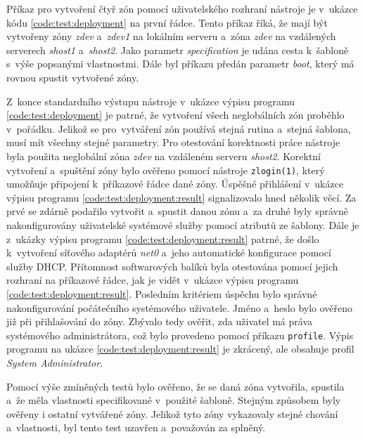 Příkaz pro vytvoření čtyř zón pomocí uživatelského rozhraní nástroje je v~ukázce kódu \ref{code:test:deployment} na první řádce.
Tento příkaz říká, že mají být vytvořeny zóny \textit{zdev} a~\textit{zdev1} na lokálním serveru a~zóna \textit{zdev} na vzdálených
serverech \textit{shost1} a~\textit{shost2}. Jako parametr \textit{specification} je udána cesta k~šabloně s~výše popsanými 
vlastnostmi. Dále byl příkazu předán parametr \textit{boot}, který má rovnou spustit vytvořené zóny.

Z~konce standardního výstupu nástroje v~ukázce výpisu programu \ref{code:test:deployment} je patrné, že vytvoření všech neglobálních zón
proběhlo v~pořádku. Jelikož se pro~vytváření zón používá stejná rutina a~stejná šablona, musí mít všechny stejné parametry.
Pro otestování korektnosti práce nástroje byla použita neglobální zóna \textit{zdev} na vzdáleném serveru \textit{shost2}.
Korektní vytvoření a~spuštění zóny bylo ověřeno pomocí nástroje \verb|zlogin(1)|, který umožňuje připojení k~příkazové řádce dané
zóny. Úspěšné přihlášení v~ukázce výpisu programu \ref{code:test:deployment:result} signalizovalo hned několik věcí. Za prvé se zdárně
podařilo vytvořit a~spustit danou zónu a~za druhé byly správně nakonfigurovány uživatelské systémové služby pomocí atributů ze šablony.
Dále je z~ukázky výpisu programu \ref{code:test:deployment:result} patrné, že došlo k~vytvoření síťového adaptérů \textit{net0} a~jeho automatické
konfigurace pomocí služby DHCP. Přítomnost softwarových
balíků byla otestována pomocí jejich rozhraní na příkazové řádce, jak je vidět v~ukázce výpisu programu \ref{code:test:deployment:result}.
Posledním kritériem úspěchu bylo správné nakonfigurování počátečního systémového uživatele. Jméno a~heslo bylo ověřeno již
při přihlašování do zóny. Zbývalo tedy ověřit, zda uživatel má práva systémového administrátora, což bylo provedeno pomocí
příkazu \verb|profile|. Výpis programu na ukázce \ref{code:test:deployment:result} je zkrácený, ale obsahuje profil \textit{System Administrator}.

Pomocí výše zmíněných testů bylo ověřeno, že se daná zóna vytvořila, spustila a~že měla vlastnosti specifikované v~použité šabloně.
Stejným způsobem byly ověřeny i ostatní vytvářené zóny. Jelikož tyto zóny vykazovaly stejné chování a~vlastnosti, byl tento
test uzavřen a~považován za splněný.

